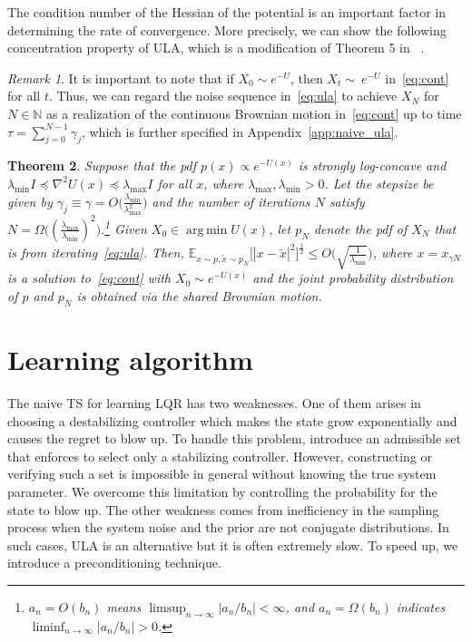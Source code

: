 \documentclass[11pt]{article}
\theoremstyle{plain}
\newtheorem{thm}{Theorem}[section]
\theoremstyle{definition}
\theoremstyle{remark}
\newtheorem{rem}[thm]{Remark}
\DeclareMathOperator*{\argmin}{arg\,min}
\begin{document}
The condition number of the Hessian of the potential is an important factor in determining the rate of convergence. More precisely, we can show the following concentration
property of ULA, which is a modification of Theorem 5 in ~\cite{mazumdar2020thompson}. 
\begin{rem}\label{rem:shared}
It is important to note that if $X_0\sim e^{-U}$, then $X_t \sim ~ e^{-U}$ in~\eqref{eq:cont} for all $t$. Thus, we can regard the noise sequence in~\eqref{eq:ula} to achieve $X_N$ for $N\in\mathbb{N}$ as a realization of the continuous Brownian motion in~\eqref{eq:cont} up to time $\tau=\sum_{j=0}^{N-1}{\gamma_j}$, which is further specified in Appendix~\ref{app:naive_ula}.
\end{rem}
\begin{thm}\label{thm:naive_ula}
Suppose that the pdf $p(x) \propto e^{-U(x)}$ is strongly log-concave and $\lambda_{\min} I\preceq \nabla^2 U(x) \preceq \lambda_{\max}I$ for all $x$, where $\lambda_{\max},\lambda_{\min}>0$. Let the stepsize be given by $\gamma_j \equiv \gamma = O\big (\frac{\lambda_{\min}}{\lambda_{\max}^2}\big )$  and the number of iterations $N$ satisfy $N = \Omega  \big ((\frac{\lambda_{\max}}{\lambda_{\min}} )^2\big ).$\footnote{$a_n = O(b_n)$ means $\limsup_{n \to \infty} |a_n/b_n |< \infty$, and $a_n = \Omega(b_n)$ indicates $\liminf_{n \to \infty}|a_n/b_n |>0$.}
Given $X_0 \in \argmin U(x)$, let $p_N$ denote the pdf of $X_N$ that is from iterating~\eqref{eq:ula}. Then, 
$\mathbb{E}_{x \sim p, \tilde{x} \sim p_N}\big[
| x- \tilde{x} |^2
\big ]^{\frac{1}{2}} \leq O\big( \sqrt{\frac{1}{\lambda_{\min}}}\big)$,
where $x=x_{\gamma N}$ is a solution to~\eqref{eq:cont} with $X_0 \sim e^{-U(x)}$ and the joint probability distribution of $p$ and $p_N$ is obtained via the shared Brownian motion.
\end{thm}


\section{Learning algorithm}

The naive TS for learning LQR has two weaknesses. One of them arises in choosing a destabilizing controller which makes the state grow exponentially and causes the regret to blow up. To handle this problem, \cite{ouyang2019posterior,gagrani2022modified} introduce an admissible set that enforces to select only a stabilizing controller. However, constructing or verifying such a set is impossible in general without knowing the true system parameter. 
We overcome this limitation by controlling the probability for the state to blow up. The other weakness comes from inefficiency in the sampling process when the system noise and the prior are not conjugate distributions. In such cases, ULA is an alternative but it is often extremely slow. To speed up, we introduce a preconditioning technique. 
\end{document}
